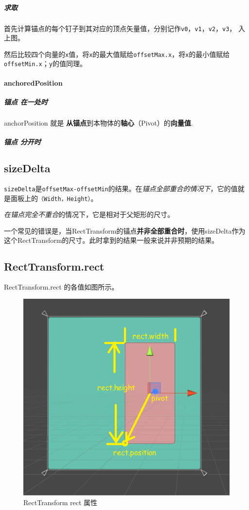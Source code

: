 \documentclass[UTF8,a4paper,12pt]{ctexbook}
\begin{document}
				\subparagraph{求取}
					首先计算锚点的每个钉子到其对应的顶点矢量值，分别记作\verb|v0|，\verb|v1|，\verb|v2|，\verb|v3|， 入上图。
					
					然后比较四个向量的\verb|x|值，将\verb|x|的最大值赋给\verb|offsetMax.x|，将\verb|x|的最小值赋给\verb|offsetMin.x|；\verb|y|的值同理。
			
			\paragraph{anchoredPosition}
				\subparagraph{锚点 在一处时}
					anchorPosition 就是 \textbf{从锚点}到本物体的\textbf{轴心}（Pivot）的\textbf{向量值}.
				
				\subparagraph{锚点 分开时}
						
		\subsection{sizeDelta}
		
			\verb|sizeDelta|是\verb|offsetMax-offsetMin|的结果。在\textit{锚点全部重合的情况下}，它的值就是面板上的\verb|（Width，Height）|。
			
			\textit{在锚点完全不重合}的情况下，它是相对于父矩形的尺寸。
			
			一个常见的错误是，当RectTransform的锚点\textbf{并非全部重合时}，使用sizeDelta作为这个RectTransform的尺寸。此时拿到的结果一般来说并非预期的结果。
			
		\subsection{RectTransform.rect}	
			RectTransform.rect 的各值如图所示。
			
			\begin{figure}[H]
				\centering
				\includegraphics[scale=0.8]{RectTransform-rect.png}
				\caption{RectTransform rect 属性}
			\end{figure}	
		
\end{document}
